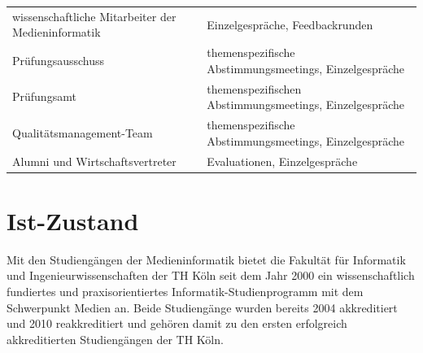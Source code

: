 \begin{longtable}[c]{@{}ll@{}}
\begin{minipage}[t]{0.5\columnwidth}
wissenschaftliche Mitarbeiter der Medieninformatik
\strut\end{minipage} &
\begin{minipage}[t]{0.5\columnwidth}\raggedright\strut
Einzelgespräche, Feedbackrunden
\strut\end{minipage}\tabularnewline
\begin{minipage}[t]{0.5\columnwidth}\raggedright\strut
Prüfungsausschuss
\strut\end{minipage} &
\begin{minipage}[t]{0.5\columnwidth}\raggedright\strut
themenspezifische Abstimmungsmeetings, Einzelgespräche
\strut\end{minipage}\tabularnewline
\begin{minipage}[t]{0.5\columnwidth}\raggedright\strut
Prüfungsamt
\strut\end{minipage} &
\begin{minipage}[t]{0.5\columnwidth}\raggedright\strut
themenspezifischen Abstimmungsmeetings, Einzelgespräche
\strut\end{minipage}\tabularnewline
\begin{minipage}[t]{0.5\columnwidth}\raggedright\strut
Qualitätsmanagement-Team
\strut\end{minipage} &
\begin{minipage}[t]{0.5\columnwidth}\raggedright\strut
themenspezifische Abstimmungsmeetings, Einzelgespräche
\strut\end{minipage}\tabularnewline
\begin{minipage}[t]{0.5\columnwidth}\raggedright\strut
Alumni und Wirtschaftsvertreter
\strut\end{minipage} &
\begin{minipage}[t]{0.5\columnwidth}\raggedright\strut
Evaluationen, Einzelgespräche
\strut\end{minipage}\tabularnewline
\bottomrule
\end{longtable}

\chapter{Ist-Zustand}\label{ist-zustand}

Mit den Studiengängen der Medieninformatik bietet die Fakultät für
Informatik und Ingenieurwissenschaften der TH Köln seit dem Jahr 2000
ein wissenschaftlich fundiertes und praxisorientiertes
Informatik-Studienprogramm mit dem Schwerpunkt Medien an. Beide
Studiengänge wurden bereits 2004 akkreditiert und 2010 reakkreditiert
und gehören damit zu den ersten erfolgreich akkreditierten Studiengängen
der TH Köln.

